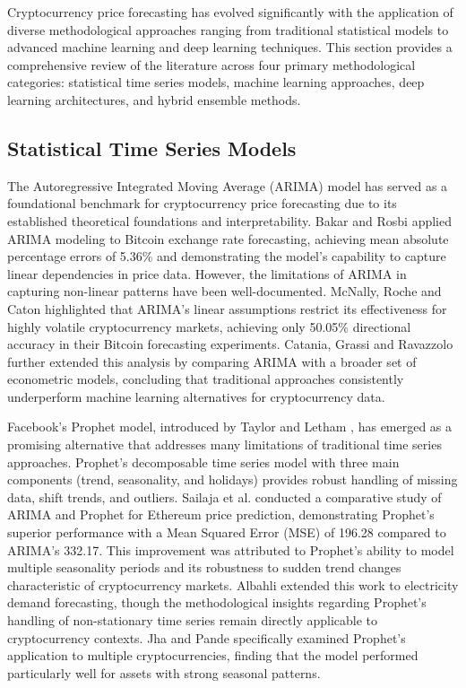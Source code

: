\documentclass[conference]{IEEEtran}
\begin{document}
Cryptocurrency price forecasting has evolved significantly with the application of diverse methodological approaches ranging from traditional statistical models to advanced machine learning and deep learning techniques. This section provides a comprehensive review of the literature across four primary methodological categories: statistical time series models, machine learning approaches, deep learning architectures, and hybrid ensemble methods.

\subsection{Statistical Time Series Models}

The Autoregressive Integrated Moving Average (ARIMA) model has served as a foundational benchmark for cryptocurrency price forecasting due to its established theoretical foundations and interpretability. Bakar and Rosbi \cite{bakar2017} applied ARIMA modeling to Bitcoin exchange rate forecasting, achieving mean absolute percentage errors of 5.36\% and demonstrating the model's capability to capture linear dependencies in price data. However, the limitations of ARIMA in capturing non-linear patterns have been well-documented. McNally, Roche and Caton \cite{mcnally2018} highlighted that ARIMA's linear assumptions restrict its effectiveness for highly volatile cryptocurrency markets, achieving only 50.05\% directional accuracy in their Bitcoin forecasting experiments. Catania, Grassi and Ravazzolo \cite{catania2019} further extended this analysis by comparing ARIMA with a broader set of econometric models, concluding that traditional approaches consistently underperform machine learning alternatives for cryptocurrency data.

Facebook's Prophet model, introduced by Taylor and Letham \cite{taylor2018}, has emerged as a promising alternative that addresses many limitations of traditional time series approaches. Prophet's decomposable time series model with three main components (trend, seasonality, and holidays) provides robust handling of missing data, shift trends, and outliers. Sailaja et al. \cite{sailaja2024} conducted a comparative study of ARIMA and Prophet for Ethereum price prediction, demonstrating Prophet's superior performance with a Mean Squared Error (MSE) of 196.28 compared to ARIMA's 332.17. This improvement was attributed to Prophet's ability to model multiple seasonality periods and its robustness to sudden trend changes characteristic of cryptocurrency markets. Albahli \cite{albahli2025} extended this work to electricity demand forecasting, though the methodological insights regarding Prophet's handling of non-stationary time series remain directly applicable to cryptocurrency contexts. Jha and Pande \cite{jha2021} specifically examined Prophet's application to multiple cryptocurrencies, finding that the model performed particularly well for assets with strong seasonal patterns.
\end{document}
